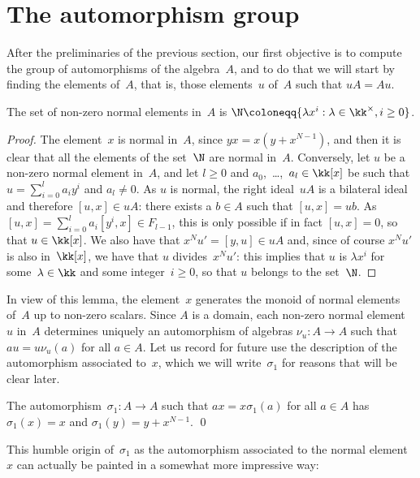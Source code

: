 \section{The automorphism group}

After the preliminaries of the previous section, our first objective is to
compute the group of automorphisms of the algebra~$A$, and to do that we
will start by finding the  elements of~$A$, that is, those
elements~$u$ of~$A$ such that $uA=Au$.

\begin{Lemma}\label{lemma:normal}
The set of non-zero normal elements in~$A$ is $\N\coloneqq\{\lambda
x^i:\lambda\in\kk^\times,i\geq0\}$.
\end{Lemma}

\begin{proof}
The element~$x$ is normal in~$A$, since $yx=x(y+x^{N-1})$, and then it is
clear that all the elements of the set~$\N$ are normal in~$A$. Conversely,
let $u$ be a non-zero normal element in~$A$, and let $l\geq0$ and
$a_0$,~\dots,~$a_l\in\kk[x]$ be such that $u=\sum_{i=0}^la_iy^i$ and
$a_l\neq0$. As $u$ is normal, the right ideal~$uA$ is a bilateral ideal and
therefore $[u,x]\in uA$: there exists a $b\in A$ such that $[u,x]=ub$. As
$[u,x]=\sum_{i=0}^la_i[y^i,x]\in F_{l-1}$, this is only possible if in fact
$[u,x]=0$, so that $u\in\kk[x]$. We also have that $x^Nu'=[y,u]\in uA$ and,
since of course $x^Nu'$ is also in~$\kk[x]$, we have that $u$
divides~$x^Nu'$: this implies that $u$ is $\lambda x^i$ for
some~$\lambda\in\kk$ and some integer~$i\geq0$, so that $u$ belongs to the
set~$\N$.
\end{proof}

In view of this lemma, the element~$x$ generates the monoid of normal
elements of~$A$ up to non-zero scalars. Since $A$ is a domain, each
non-zero normal element~$u$ in~$A$ determines uniquely an automorphism of
algebras $\nu_u:A\to A$ such that $au=u\nu_u(a)$ for all $a\in A$. Let us
record for future use the description of the automorphism associated
to~$x$, which we will write~$\sigma_1$ for reasons that will be clear later.

\begin{Lemma}\label{lemma:sigma-1}
The automorphism~$\sigma_1:A\to A$ such that $ax=x\sigma_1(a)$ for all
$a\in A$ has $\sigma_1(x)=x$ and $\sigma_1(y)=y+x^{N-1}$. \qed
\end{Lemma}

This humble origin of~$\sigma_1$ as the automorphism associated to the
normal element~$x$ can actually be painted in a somewhat more impressive
way:


